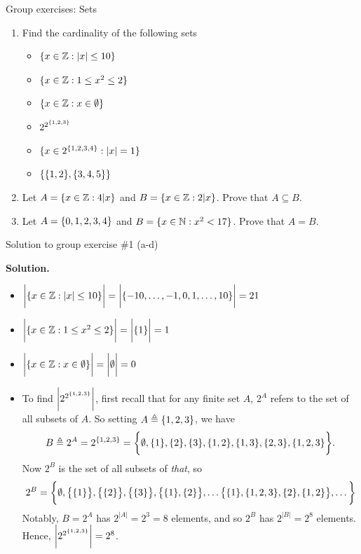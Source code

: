 \documentclass[10pt]{beamer}
\begin{document}
\begin{frame}{Group exercises: Sets}


\begin{enumerate}
\item Find the cardinality of the following sets
\begin{itemize}
\item[a)] $\{ {x \in \mathbb{Z}: |x| \leq 10} \}$
\item[b)] $\{ {x \in \mathbb{Z}: 1 \leq x^2 \leq 2} \}$
\item[c)] $\{ {x \in \mathbb{Z}: x \in \emptyset} \}$
\item[d)] $2^{2^{\{ {1,2,3} \}}}$
\item[e)] $\{ {x \in 2^{\{ {1,2,3,4} \}}: |x|=1} \}$
\item[f)] $\{ {\{ {1,2} \}, \{ {3,4,5} \}} \}$
\end{itemize}
\item Let $A= \{ {x \in \mathbb{Z}: 4|x} \}$ and  $B= \{ {x \in \mathbb{Z}: 2|x} \}$.  Prove that $A \subseteq B$.
\item Let $A= \{ {0,1,2,3,4} \}$ and  $B= \{ {x \in \mathbb{N}: x^2<17} \}$.  Prove that $A=B$.
\end{enumerate}

\end{frame}



\begin{frame}{Solution to group exercise \#1 (a-d)}

\small 
\textbf{Solution.}

\begin{itemize}
\item[a)] $\bigg|\{ {x \in \mathbb{Z}: |x| \leq 10} \}\bigg|=\bigg| \{ {-10, \hdots, -1, 0, 1, \hdots, 10} \} \bigg| = 21$
\item[b)] $\bigg|\{ {x \in \mathbb{Z}: 1 \leq x^2 \leq 2} \}\bigg| = \bigg| \{ {1} \} \bigg| = 1 $
\item[c)] $\bigg| \{ {x \in \mathbb{Z}: x \in \emptyset} \} \bigg| = \bigg| \emptyset \bigg| = 0 $
\item[d)] To find $\bigg|2^{2^{\{ {1,2,3} \}}}\bigg|$, first recall that for any finite set $A$, $2^A$ refers to the set of all subsets of $A$. So setting $A \triangleq \{ {1,2,3} \}$, we have 
\[ B \triangleq 2^A = 2^{\{ {1,2,3} \}} = \bigg\{ \emptyset, \{ {1} \}, \{ {2} \}, \{ {3} \}, \{ {1,2} \}, \{ {1,3} \}, \{ {2,3} \}, \{ {1,2,3} \} \bigg\}. \]
Now  $2^B$ is the set of all subsets of \textit{that}, 
so
\[2^B = \bigg\{ \emptyset,  \big\{ \{ {1} \}  \big\}, \big\{ \{ {2} \} \big\}, \big\{  \{ {3} \} \big\} , \big\{  \{ {1} \},\{ {2} \} \big\}, \hdots  \big\{  \{ {1} \}, \{ {1,2,3} \}, \{ {2} \}, \{ {1,2} \} \big\} , \hdots \bigg\}  \]
Notably, $B=2^A$ has $2^{|A|} = 2^3=8$ elements, and so $2^B$ has $2^{|B|} = 2^8$ elements. Hence,  $\bigg|2^{2^{\{ {1,2,3} \}}}\bigg| = 2^8$.
\end{itemize}


\end{frame}
\end{document}
